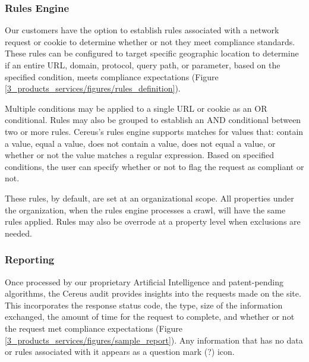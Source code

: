 
\subsubsection{Rules Engine}

Our customers have the option to establish rules associated with a network request or cookie to determine whether or not they meet compliance standards. These rules can be configured to target specific geographic location to determine if an entire URL, domain, protocol, query path, or parameter, based on the specified condition, meets compliance expectations (Figure \ref{3_products_services/figures/rules_definition}).

Multiple conditions may be applied to a single URL or cookie as an OR conditional. Rules may also be grouped to establish an AND conditional between two or more rules. Cereus's rules engine supports matches for values that: contain a value, equal a value, does not contain a value, does not equal a value, or whether or not the value matches a regular expression. Based on specified conditions, the user can specify whether or not to flag the request as compliant or not.


These rules, by default, are set at an organizational scope. All properties under the organization, when the rules engine processes a crawl, will have the same rules applied. Rules may also be overrode at a property level when exclusions are needed.

\subsubsection{Reporting}

Once processed by our proprietary Artificial Intelligence and patent-pending algorithms, the Cereus audit provides insights into the requests made on the site. This incorporates the response status code, the type, size of the information exchanged, the amount of time for the request to complete, and whether or not the request met compliance expectations (Figure \ref{3_products_services/figures/sample_report}). Any information that has no data or rules associated with it appears as a question mark (?) icon.

